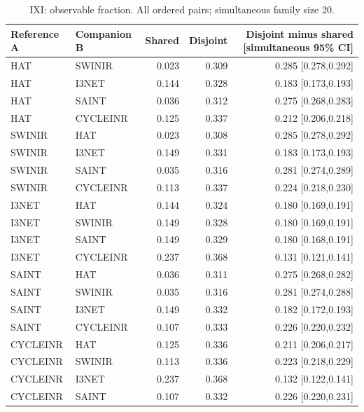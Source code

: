 \begin{table}[t]\centering\small
\caption{IXI: observable fraction. All ordered pairs; simultaneous family size 20.}
\begin{tabular}{llrrr}\toprule Reference A & Companion B & Shared & Disjoint & Disjoint minus shared [simultaneous 95\% CI]\\\midrule
HAT & SWINIR & 0.023 & 0.309 & 0.285 [0.278,0.292] \\
HAT & I3NET & 0.144 & 0.328 & 0.183 [0.173,0.193] \\
HAT & SAINT & 0.036 & 0.312 & 0.275 [0.268,0.283] \\
HAT & CYCLEINR & 0.125 & 0.337 & 0.212 [0.206,0.218] \\
SWINIR & HAT & 0.023 & 0.308 & 0.285 [0.278,0.292] \\
SWINIR & I3NET & 0.149 & 0.331 & 0.183 [0.173,0.193] \\
SWINIR & SAINT & 0.035 & 0.316 & 0.281 [0.274,0.289] \\
SWINIR & CYCLEINR & 0.113 & 0.337 & 0.224 [0.218,0.230] \\
I3NET & HAT & 0.144 & 0.324 & 0.180 [0.169,0.191] \\
I3NET & SWINIR & 0.149 & 0.328 & 0.180 [0.169,0.191] \\
I3NET & SAINT & 0.149 & 0.329 & 0.180 [0.168,0.191] \\
I3NET & CYCLEINR & 0.237 & 0.368 & 0.131 [0.121,0.141] \\
SAINT & HAT & 0.036 & 0.311 & 0.275 [0.268,0.282] \\
SAINT & SWINIR & 0.035 & 0.316 & 0.281 [0.274,0.288] \\
SAINT & I3NET & 0.149 & 0.332 & 0.182 [0.172,0.193] \\
SAINT & CYCLEINR & 0.107 & 0.333 & 0.226 [0.220,0.232] \\
CYCLEINR & HAT & 0.125 & 0.336 & 0.211 [0.206,0.217] \\
CYCLEINR & SWINIR & 0.113 & 0.336 & 0.223 [0.218,0.229] \\
CYCLEINR & I3NET & 0.237 & 0.368 & 0.132 [0.122,0.141] \\
CYCLEINR & SAINT & 0.107 & 0.332 & 0.226 [0.220,0.231] \\
\bottomrule\end{tabular}\end{table}
